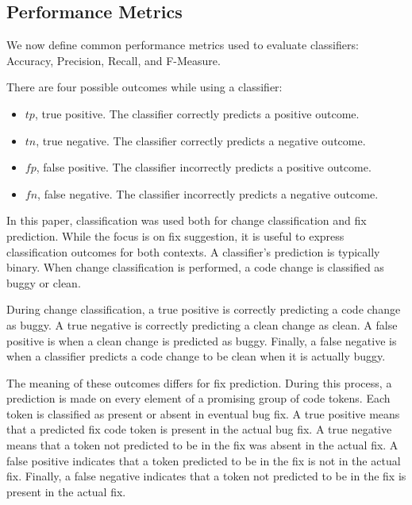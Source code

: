 \documentclass[conference]{IEEEtran}
\begin{document}
\subsection{Performance Metrics}
\label{section:PerformanceMetrics}


\par We now define common performance metrics used to evaluate classifiers:
Accuracy, Precision, Recall, and F-Measure.

There are four possible outcomes while using a classifier:
\begin{itemize}
  \item $tp$, true positive. The classifier correctly predicts a positive outcome.
  \item $tn$, true negative. The classifier correctly predicts a negative outcome.
  \item $fp$, false positive. The classifier incorrectly predicts a positive outcome.
  \item $fn$, false negative. The classifier incorrectly predicts a negative outcome.
\end{itemize}

In this paper, classification was used both for change classification and fix prediction. While the focus is on fix suggestion, 
it is useful to express classification outcomes for both contexts. A classifier's prediction is typically binary. When change classification is performed, a code change is classified as buggy or clean.

During change classification, a true positive is correctly predicting a code change as buggy. A true negative is correctly predicting a clean change as clean. 
A false positive is when a clean change is predicted as buggy. Finally, a false negative is when a classifier predicts a code change to be clean when it is actually buggy. 

The meaning of these outcomes differs for fix prediction. During this process, a prediction is made on every element of a promising group of code tokens. Each token is classified as present or absent in eventual bug fix. A true positive means that a predicted fix code token is present in the actual bug fix. A true negative means that a token not predicted to be in the fix was absent in the actual fix. 
A false positive indicates that a token predicted to be in the fix is not in the actual fix. Finally, a false negative indicates that a token not predicted to be in the fix is present in the actual fix.

%
\end{document}
